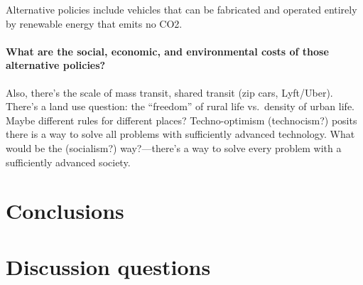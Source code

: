 \documentclass[12pt]{article}
\begin{document}
Alternative policies include vehicles that can be fabricated and operated entirely by renewable energy that emits no CO2. 

\paragraph{What are the social, economic, and environmental costs of those alternative policies?} 



Also, there's the scale of mass transit, 
shared transit (zip cars, Lyft/Uber). 
There’s a land use question: 
the ``freedom'' of rural life vs.\ density of urban life. 
Maybe different rules for different places?
Techno-optimism (technocism?) 
posits there is a way to solve all problems with sufficiently advanced technology. 
What would be the (socialism?) way?---there's a way to solve every problem 
with a sufficiently advanced society.




\section{Conclusions}
\label{sec:conclusions}


\appendix

\section{Discussion questions}
\label{sec:discussion_questions}
\end{document}
